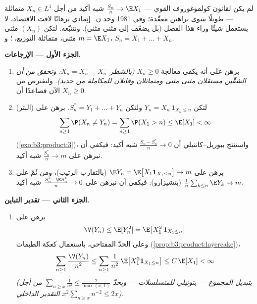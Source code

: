 \begin{problem}
\label{pb:b3:probability:1}
لم يكن لقانون كولموغوروف القوي --- $\frac{S_n}n \to \E X_1$ شبه أكيد من أجل
$X_n \in L^1$  متماثلة --- طويلًا سوى براهين معقّدة؛
وفي 1981 وجد ن.~إتِمادي برهانًا لافت الاقتصاد، لا يستعمل شيئًا
وراء هذا الفصل (بل يضعّف  إلى  مثنى مثنى).
ونتتبّعه. لتكن $(X_n)$  مثنى مثنى، متماثلة التوزيع،
؛ و $m = \E X_1$، $S_n = X_1 + \dots + X_n$.

\medskip
\noindent\textbf{الجزء الأول --- الإرجاعات.}
\begin{enumerate}
  \item برهن على أنه يكفي معالجة $X_n \geq 0$ \emph{(بالشطر
        $X_n = X_n^+ - X_n^-$: وتحقق من أن الشقّين مستقلان مثنى مثنى
        ومتماثلان وقابلان للمكاملة من جديد)}. ولنفترض من الآن
        فصاعدًا أن $X_n \geq 0$.
  \item (البتر) لتكن $Y_n = X_n\,\mathbf 1_{X_n \leq n}$ ولتكن $S_n^* = Y_1 + \dots + Y_n$. برهن على
        \[
        \sum_{n\geq1}\P(X_n \neq Y_n) =
        \sum_{n\geq1}\P(X_1 > n) \leq \E[X_1] < \infty
        \]
        (\cref{exo:b3:product:3})، واستنتج ببوريل--كانتيلي أن $\frac{S_n - S_n^*}{n} \to 0$ شبه
        أكيد: فيكفي أن نبرهن على $\frac{S^*_n}n \to m$ شبه أكيد.
  \item برهن على $\E Y_n = \E\bigl[X_1\mathbf 1_{X_1\leq
        n}\bigr] \to m$ (بالتقارب الرتيب)، ومن ثَمّ على
        $\frac1n\sum_{k\leq n}\E Y_k \to m$ (بتشيزارو): فيكفي أن نبرهن على $\frac{S_n^* - \E S_n^*}{n} \to 0$ شبه
        أكيد.
\end{enumerate}

\medskip
\noindent\textbf{الجزء الثاني --- تقدير التباين.}
\begin{enumerate}[resume]
  \item برهن على
        \[
        \V(Y_n) \leq \E[Y_n^2] = \E\bigl[X_1^2\,\mathbf
        1_{X_1 \leq n}\bigr]
        \]
        وعلى الحدّ المفتاحي، باستعمال كعكة الطبقات
        (\cref{prop:b3:product:layercake})،
        \[
        \sum_{n\geq1}\frac{\V(Y_n)}{n^2}
        \leq \sum_{n\geq1}\frac1{n^2}\,
        \E\bigl[X_1^2\mathbf 1_{X_1\leq n}\bigr]
        \leq C\,\E[X_1] < \infty
        \]
        \emph{(بتبديل المجموع  --- بتونيلي للمتسلسلات
        --- وبحدّ $\sum_{n \geq
        x}\frac1{n^2} \leq \frac2{\max(x,1)}$ من أجل التقدير الداخلي $x^2\sum_{n\geq x}n^{-2} \leq 2x$)}.
\end{enumerate}


\end{problem}
